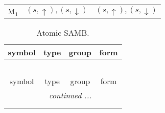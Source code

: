 \documentclass[fleqn,10pt,landscape]{article}
\begin{document}
\begin{itemize}
\begin{center}
\begin{longtable}{c|c|c}
M$_{1}$ & $(s,\uparrow), (s,\downarrow)$ & $(s,\uparrow), (s,\downarrow)$ \\
\end{longtable}
\end{center}
\begin{center}
\renewcommand{\arraystretch}{1.3}
\begin{longtable}{c|c|c|c}
\caption{Atomic SAMB.}
 \\
 \hline \hline
symbol & type & group & form \\ \hline \endfirsthead

\multicolumn{3}{l}{\tablename\ \thetable{}} \\
 \hline \hline
symbol & type & group & form \\ \hline \endhead

 \hline \hline
\multicolumn{3}{r}{\footnotesize\it continued ...} \\ \endfoot

 \hline \hline
\multicolumn{3}{r}{} \\ \endlastfoot


\end{longtable}
\end{center}
\end{itemize}
\end{document}
